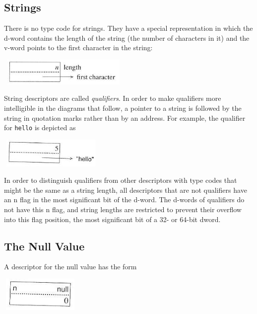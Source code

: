 \subsection{Strings}

There is no type code for strings. They have a special representation
in which the d-word contains the length of the string (the number of
characters in it) and the v-word points to the first character in the
string:



\begin{center}
\includegraphics[width=2.4898in,height=0.5193in]{ib-img/ib-img006.jpg}
\end{center}

String descriptors are called \textit{qualifiers}. In order to make
qualifiers more intelligible in the diagrams that follow, a pointer to
a string is followed by the string in quotation marks rather than by
an address. For example, the qualifier for
\texttt{{\textquotedbl}hello{\textquotedbl}} is depicted as

\begin{center}
\includegraphics[width=1.9693in,height=0.5598in]{ib-img/ib-img007.jpg}
\end{center}

In order to distinguish qualifiers from other descriptors with type
codes that might be the same as a string length, all descriptors that
are not qualifiers have an n flag in the most significant bit of the
d-word. The d-words of qualifiers do not have this n flag, and string
lengths are restricted to prevent their overflow into this flag
position, the most significant bit of a 32- or 64-bit dword.

\subsection{The Null Value}

A descriptor for the null value has the form

\begin{center}
\includegraphics[width=1.5193in,height=0.6598in]{ib-img/ib-img008.jpg}
\end{center}

